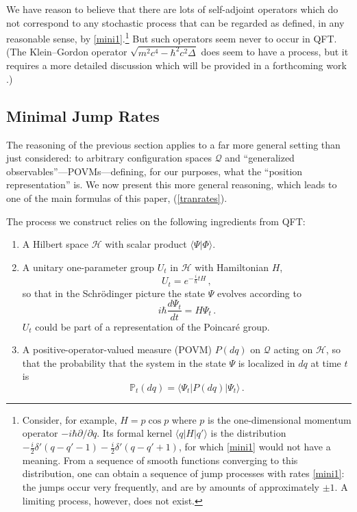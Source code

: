 \documentclass[12pt]{article}
\newcommand{\E}{e} %
\newcommand{\I}{i} %
\newcommand{\1}{\mathbf{1}} %
\newcommand{\Laplace}{\Delta} %
\newcommand{\Hilbert}{\mathscr{H}}
\renewcommand{\sp}[2]{\langle #1 | #2 \rangle} %
\newcommand{\conf}{\mathcal{Q}} %
\newcommand{\measure}{\mathbb{P}} %
\newcommand{\pov}{{P}}%
\begin{document}
We have reason to believe that there are lots of self-adjoint
operators which do not correspond to any stochastic process that can
be regarded as defined, in any reasonable sense, by
\eqref{mini1}.\footnote{Consider, for example, $H = p \cos p$ where
$p$ is the one-dimensional momentum operator $-\I\hbar
\partial/\partial q$. Its formal kernel $\sp{q}{H|q'}$ is the
distribution $-\frac{\I}{2} \delta'(q-q'-1) - \frac{\I}{2}
\delta'(q-q'+1)$, for which \eqref{mini1} would not have a meaning.
{}From a sequence of smooth functions converging to this distribution,
one can obtain a sequence of jump processes with rates \eqref{mini1}:
the jumps occur very frequently, and are by amounts of approximately
$\pm 1$.  A limiting process, however, does not exist.}  But such
operators seem never to occur in QFT. (The Klein--Gordon operator
$\sqrt{m^2 c^4 - \hbar^2 c^2 \Laplace}$ does seem to have a process,
but it requires a more detailed discussion which will be provided in a
forthcoming work \cite{klein2}.)


\subsection{Minimal Jump Rates}
\label{sec:mini2}

The reasoning of the previous section applies to a far more general
setting than just considered: to arbitrary configuration spaces
$\conf$ and ``generalized observables''---POVMs---defining, for our
purposes, what the ``position representation'' is. We now present this
more general reasoning, which leads to one of the main formulas of
this paper, (\ref{tranrates}).

The process we construct relies on the following ingredients from QFT:
\begin{enumerate}
\item A Hilbert space $\Hilbert$ with scalar product $\sp{\Psi}
   {\Phi}$.

\item A unitary one-parameter group $U_t$ in $\Hilbert$ with
   Hamiltonian $H$,
   \[
     U_t = \E^{-\frac{\I}{\hbar}tH}\,,
   \]
   so that in the Schr\"odinger picture the state $\Psi$ evolves
   according to
   \begin{equation}
     \I\hbar\frac{d\Psi_t}{dt} = H\Psi_t\,.
   \end{equation}
   $U_t$ could be part of a representation of the Poincar\'e group.

\item A positive-operator-valued measure (POVM) $\pov(dq)$ on $\conf$
   acting on $\Hilbert$, so that the probability that the system in the
   state $\Psi$ is localized in $dq$ at time $t$ is
   \begin{equation} \label{mis}
     \measure_t(dq)= \sp{\Psi_t}{\pov(dq)| \Psi_t} \,.
   \end{equation}
\end{enumerate}
\end{document}
